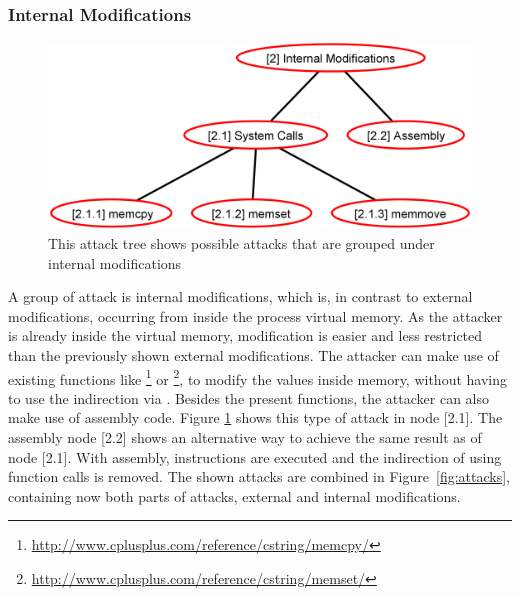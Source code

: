 \subsubsection{Internal Modifications}
\label{sec:internal_modifications}
\begin{figure}[h]
\centering
\includegraphics[width=.75\textwidth, keepaspectratio]{sections/adtrees/InternalModificationsWithoutDefenses.png}
\caption{This attack tree shows possible attacks that are grouped under internal modifications}
\label{fig:attacks_internal}
\end{figure}
A group of attack is internal modifications, which is, in contrast to external modifications, occurring from inside the process virtual memory. As the attacker is already inside the virtual memory, modification is easier and less restricted than the previously shown external modifications. The attacker can make use of existing functions like \footnote{\url{http://www.cplusplus.com/reference/cstring/memcpy/}} or \footnote{\url{http://www.cplusplus.com/reference/cstring/memset/}}, to modify the values inside memory, without having to use the indirection via . Besides the present  functions, the attacker can also make use of assembly code. Figure \ref{fig:attacks_internal} shows this type of attack in node [2.1]. The assembly node [2.2] shows an alternative way to achieve the same result as of node [2.1]. With assembly, instructions are executed and the indirection of using function calls is removed. The shown attacks are combined in Figure~\ref{fig:attacks}, containing now both parts of attacks, external and internal modifications.